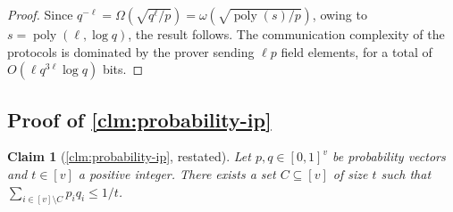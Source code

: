 \documentclass[10pt,a4paper]{article}
\newtheorem{claim}[theorem]{Claim}
\theoremstyle{definition}
\newcommand{\poly}{\operatorname{poly}}
\newcommand{\vcommitlength}{v}
\newcommand{\pcommitlength}{p}
\newcommand{\fieldsize}{q}
\begin{document}
\begin{proof}
    Since $\fieldsize^{-\ell} = \Omega\left(\sqrt{\fieldsize^\ell/\pcommitlength}\right)= \omega\left(\sqrt{\poly(s)/\pcommitlength}\right)$, owing to $s = \poly(\ell, \log \fieldsize)$, the result follows. The communication complexity of the protocols is dominated by the prover sending $\ell \pcommitlength$ field elements, for a total of $O(\ell \fieldsize^{3 \ell} \log \fieldsize)$ bits.
\end{proof}

\subsection{Proof of \texorpdfstring{\cref{clm:probability-ip}}{Claim \ref{clm:probability-ip}}}
\label{sec:deferred-probability-ip}

\begin{claim}[\cref{clm:probability-ip}, restated]
    Let $p, q \in [0,1]^\vcommitlength$ be probability vectors and $t \in [\vcommitlength]$ a positive integer. There exists a set $C \subseteq [\vcommitlength]$ of size $t$ such that $\sum_{i \in [\vcommitlength] \setminus C} p_i q_i \leq 1/t$.
\end{claim}
\end{document}
